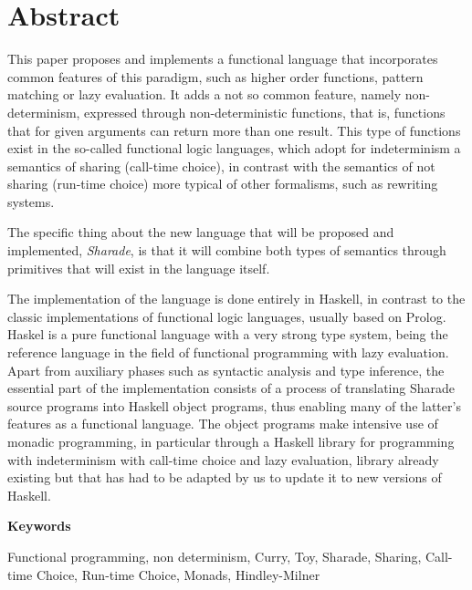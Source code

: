 \documentclass[class=article, crop=false]{standalone}
\begin{document}
\section{Abstract}

This paper proposes and implements a functional language that incorporates common features of
this paradigm, such as higher order functions, pattern matching or lazy evaluation. It adds a
not so common feature, namely non-determinism, expressed through non-deterministic functions,
that is, functions that for given arguments can return more than one result. This type of
functions exist in the so-called functional logic languages, which adopt for indeterminism a
semantics of sharing (call-time choice), in contrast with the semantics of not sharing
(run-time choice) more typical of other formalisms, such as rewriting systems.

The specific thing about the new language that will be proposed and implemented,
\textit{Sharade}, is that it will combine both types of semantics through primitives that
will exist in the language itself.

The implementation of the language is done entirely in Haskell, in contrast to the classic
implementations of functional logic languages, usually based on Prolog. Haskel is a pure
functional language with a very strong type system, being the reference language in the field
of functional programming with lazy evaluation. Apart from auxiliary phases such as syntactic
analysis and type inference, the essential part of the implementation consists of a
process of translating Sharade source programs into Haskell object programs, thus enabling
many of the latter's features as a functional language. The object programs make intensive
use of monadic programming, in particular through a Haskell library for programming with
indeterminism with call-time choice and lazy evaluation, library already existing but that
has had to be adapted by us to update it to new versions of Haskell.

\vspace{0.5cm}
\textbf{Keywords}

Functional programming, non determinism, Curry, Toy, Sharade, Sharing, Call-time Choice,
Run-time Choice, Monads, Hindley-Milner
\end{document}

